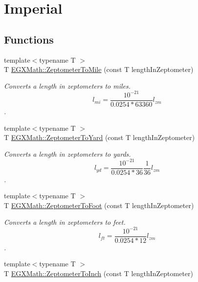 \hypertarget{group___e_g_x_math-_conversions-_length_conversions-_zeptometer-_imperial}{}\section{Imperial}
\label{group___e_g_x_math-_conversions-_length_conversions-_zeptometer-_imperial}
\subsection*{Functions}
\begin{DoxyCompactItemize}
\item 
{\footnotesize template$<$typename T $>$ }\\T \mbox{\hyperlink{group___e_g_x_math-_conversions-_length_conversions-_zeptometer-_imperial_ga2cd73cc7564758f2bf88f1a6e9269aff}{E\+G\+X\+Math\+::\+Zeptometer\+To\+Mile}} (const T length\+In\+Zeptometer)
\begin{DoxyCompactList}\small\item\em Converts a length in zeptometers to miles. \[ l_{mi}=\frac{10^{-21}}{0.0254 * 63360} l_{zm} \]. \end{DoxyCompactList}\item 
{\footnotesize template$<$typename T $>$ }\\T \mbox{\hyperlink{group___e_g_x_math-_conversions-_length_conversions-_zeptometer-_imperial_ga91e05169db4f6ae477da7428ff5a42b8}{E\+G\+X\+Math\+::\+Zeptometer\+To\+Yard}} (const T length\+In\+Zeptometer)
\begin{DoxyCompactList}\small\item\em Converts a length in zeptometers to yards. \[ l_{yd}= \frac{10^{-21}}{0.0254 * 36} \frac{1}{36} l_{zm} \]. \end{DoxyCompactList}\item 
{\footnotesize template$<$typename T $>$ }\\T \mbox{\hyperlink{group___e_g_x_math-_conversions-_length_conversions-_zeptometer-_imperial_ga2567dcbdc1b08aa9c9e99082ad9fe92b}{E\+G\+X\+Math\+::\+Zeptometer\+To\+Foot}} (const T length\+In\+Zeptometer)
\begin{DoxyCompactList}\small\item\em Converts a length in zeptometers to feet. \[ l_{ft}= \frac{10^{-21}}{0.0254 * 12} l_{zm} \]. \end{DoxyCompactList}\item 
{\footnotesize template$<$typename T $>$ }\\T \mbox{\hyperlink{group___e_g_x_math-_conversions-_length_conversions-_zeptometer-_imperial_ga6bd6b3ee6932c6aa40442a9bff2580cb}{E\+G\+X\+Math\+::\+Zeptometer\+To\+Inch}} (const T length\+In\+Zeptometer)

\end{DoxyCompactItemize}
